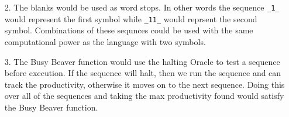 \documentclass{article}
\begin{document}
\begin{enumerate}
\item[2.]
	The blanks would be used as word stops. In other words the sequence \texttt{\_1\_} would represent the first symbol while \texttt{\_11\_} would reprsent the second symbol. Combinations of these sequnces could be used with the same computational power as the language with two symbols.

\item[3.]
	The Busy Beaver function would use the halting Oracle to test a sequence before execution. If the sequence will halt, then we run the sequence and can track the productivity, otherwise it moves on to the next sequence. Doing this over all of the sequences and taking the max productivity found would satisfy the Busy Beaver function.
\end{enumerate}
\end{document}
